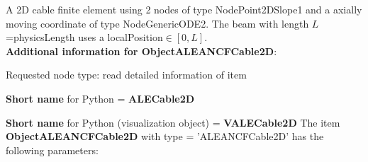 \label{sec:item:ObjectALEANCFCable2D}
A 2D cable finite element using 2 nodes of type NodePoint2DSlope1 and a axially moving coordinate of type NodeGenericODE2. The beam with length $L$=physicsLength uses a localPosition$\in [0, L]$.\vspace{12pt}
 \\{\bf Additional information for ObjectALEANCFCable2D}:
\bi
  \item Requested node type: read detailed information of item
  \item {\bf Short name} for Python = {\bf ALECable2D}  \item {\bf Short name} for Python (visualization object) = {\bf VALECable2D}\ei
\vspace{12pt} \noindent The item {\bf ObjectALEANCFCable2D} with type = 'ALEANCFCable2D' has the following parameters:\vspace{-1cm}\\ 
